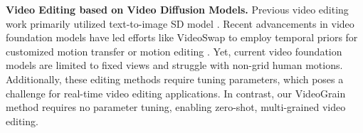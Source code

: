 \noindent\textbf{Video Editing based on Video Diffusion Models.}
Previous video editing work primarily utilized text-to-image SD model \citep{rombach2022high}. 
Recent advancements in video foundation models \citep{yu2023magvit, guo2023animatediff, wang2023modelscope, yang2024cogvideox} have led efforts like VideoSwap \citep{gu2023videoswap} to employ temporal priors for customized motion transfer or motion editing \citep{mou2025revideo}.
Yet, current video foundation models are limited to fixed views and struggle with non-grid human motions. Additionally, these editing methods require tuning parameters, which poses a challenge for real-time video editing applications. In contrast, our VideoGrain method requires no parameter tuning, enabling zero-shot, multi-grained video editing.

\iffalse